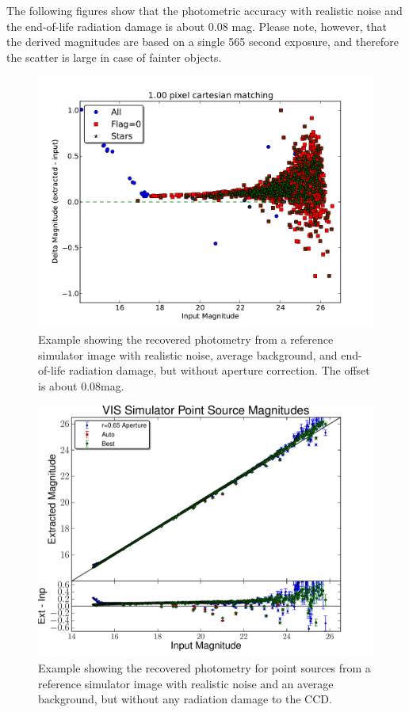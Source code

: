 \documentclass[a4paper,11pt,english]{sphinxmanual}
\begin{document}
The following figures show that the photometric accuracy with realistic noise and the end-of-life radiation damage is
about 0.08 mag. Please note, however, that the derived magnitudes are based on a
single 565 second exposure, and therefore the scatter is large in case of fainter objects.
\begin{figure}[htbp]
\centering
\capstart

\includegraphics{Magnitudes15.pdf}
\caption{Example showing the recovered photometry from a reference simulator image with realistic noise, average background,
and end-of-life radiation damage, but without aperture correction. The offset is about 0.08mag.}\end{figure}
\begin{figure}[htbp]
\centering
\capstart

\includegraphics{magnitudes.pdf}
\caption{Example showing the recovered photometry for point sources from a reference simulator image with realistic noise
and an average background, but without any radiation damage to the CCD.}\end{figure}
\end{document}
